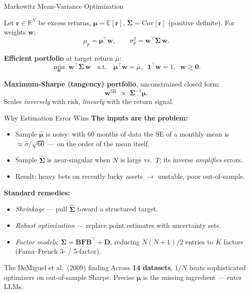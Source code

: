 \documentclass[9pt,t]{beamer}
\begin{document}
\begin{frame}{Markowitz Mean-Variance Optimization}
\begin{underhood}
Let $\mathbf{r}\in\mathbb{R}^N$ be excess returns, $\boldsymbol{\mu}=\mathbb{E}[\mathbf{r}]$,
$\boldsymbol{\Sigma}=\mathrm{Cov}[\mathbf{r}]$ (positive definite). For weights $\mathbf{w}$:
\[
\mu_p = \boldsymbol{\mu}^\top\mathbf{w}, \qquad \sigma_p^2 = \mathbf{w}^\top\boldsymbol{\Sigma}\,\mathbf{w}.
\]
\end{underhood}

\medskip
\textbf{Efficient portfolio} at target return $\bar\mu$:
\[
\min_{\mathbf{w}} \; \mathbf{w}^\top\boldsymbol{\Sigma}\,\mathbf{w}
\quad\text{s.t.}\quad
\boldsymbol{\mu}^\top\mathbf{w}=\bar\mu,\;\; \mathbf{1}^\top\mathbf{w}=1,\;\; \mathbf{w}\ge\mathbf{0}.
\]

\textbf{Maximum-Sharpe (tangency) portfolio}, unconstrained closed form:
\[
\mathbf{w}^{\text{SR}} \;\propto\; \boldsymbol{\Sigma}^{-1}\boldsymbol{\mu}.
\]
Scales \emph{inversely} with risk, \emph{linearly} with the return signal.
\end{frame}

\begin{frame}{Why Estimation Error Wins}
\textbf{The inputs are the problem:}
\begin{itemize}
  \item Sample $\hat{\boldsymbol{\mu}}$ is noisy: with 60 months of data the SE of a
        monthly mean is $\approx\hat\sigma/\sqrt{60}$ --- on the order of the mean itself.
  \item Sample $\hat{\boldsymbol{\Sigma}}$ is near-singular when $N$ is large vs.\ $T$;
        its inverse \emph{amplifies} errors.
  \item Result: heavy bets on recently lucky assets $\to$ unstable, poor out-of-sample.
\end{itemize}

\medskip
\textbf{Standard remedies:}
\begin{itemize}
  \item \emph{Shrinkage} --- pull $\hat{\boldsymbol{\Sigma}}$ toward a structured target.
  \item \emph{Robust optimization} --- replace point estimates with uncertainty sets.
  \item \emph{Factor models}: $\boldsymbol{\Sigma}=\mathbf{B}\mathbf{F}\mathbf{B}^\top+\mathbf{D}$,
        reducing $N(N{+}1)/2$ entries to $K$ factors (Fama--French 3- / 5-factor).
\end{itemize}

\medskip
\begin{alertblock}{The DeMiguel et al.\ (2009) finding}
Across \textbf{14 datasets}, $1/N$ beats sophisticated optimizers on out-of-sample
Sharpe. Precise $\boldsymbol{\mu}$ is the missing ingredient --- enter LLMs.
\end{alertblock}
\end{frame}
\end{document}
